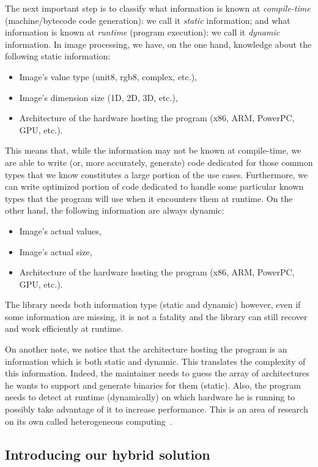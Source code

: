 The next important step is to classify what information is known at \emph{compile-time} (machine/bytecode code
generation): we call it \emph{static} information; and what information is known at \emph{runtime} (program execution):
we call it \emph{dynamic} information. In image processing, we have, on the one hand, knowledge about the following
static information:
\begin{itemize}
  \item Image's value type (unit8, rgb8, complex, etc.),
  \item Image's dimension size (1D, 2D, 3D, etc.),
  \item Architecture of the hardware hosting the program (x86, ARM, PowerPC, GPU, etc.).
\end{itemize}
This means that, while the information may not be known at compile-time, we are able to write (or, more accurately,
generate) code dedicated for those common types that we know constitutes a large portion of the use cases. Furthermore,
we can write optimized portion of code dedicated to handle some particular known types that the program will use when it
encounters them at runtime.
On the other hand, the following information are always dynamic:
\begin{itemize}
  \item Image's actual values,
  \item Image's actual size,
  \item Architecture of the hardware hosting the program (x86, ARM, PowerPC, GPU, etc.).
\end{itemize}
The library needs both information type (static and dynamic) however, even if some information are missing, it is not a
fatality and the library can still recover and work efficiently at runtime.

On another note, we notice that the architecture hosting the program is an information which is both static and dynamic.
This translates the complexity of this information. Indeed, the maintainer needs to guess the array of architectures he
wants to support and generate binaries for them (static). Also, the program needs to detect at runtime (dynamically) on
which hardware he is running to possibly take advantage of it to increase performance. This is an area of research on
its own called heterogeneous computing~\parencite{wong.2019.heterogeneous,brown.2019.heterogeneous}.


\subsection{Introducing our hybrid solution}

